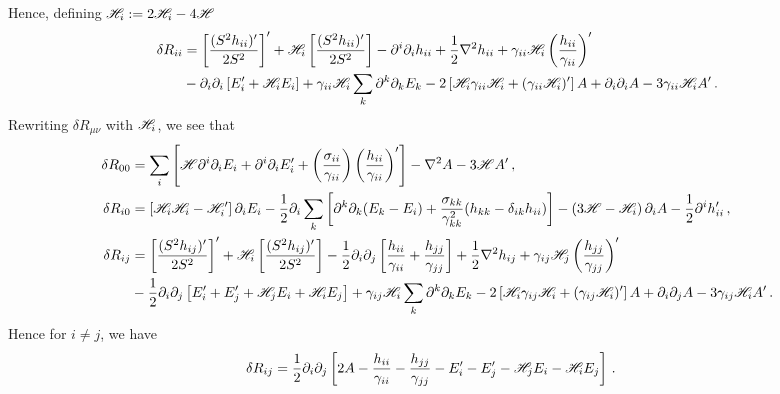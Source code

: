 \documentclass{article}
\newcommand*\scr[1]{\mathscr{#1}}
\newcommand*\p[1]{\left(#1\right)}
\newcommand*\ps[1]{\left[#1\right]}
\newcommand*\f[2]{\frac{#1}{#2}}
\begin{document}
Hence, defining ${\cal H}_i:=2\scr H_i-4\scr H$
\begin{align}
\delta R_{ii}&=\ps{\f{(S^2h_{ii})'}{2S^2}}'+{\cal H}_i\ps{\f{(S^2h_{ii})'}{2S^2}}-\partial^i\partial_ih_{ii}+\f12\nabla^2h_{ii}+\gamma_{ii}\scr H_i\p{\f{h_{ii}}{\gamma_{ii}}}'\\&-\partial_i\partial_i\ps{E_i'+{\cal H}_iE_i}+\gamma_{ii}\scr H_i\sum_k\partial^k\partial_kE_k-2\ps{{\cal H}_i\gamma_{ii}\scr H_i+(\gamma_{ii}\scr H_i)'}A+\partial_i\partial_i A-3\gamma_{ii}\scr H_i A'\,.
\end{align}
Rewriting $\delta R_{\mu\nu}$ with ${\cal H}_i$, we see that
\begin{align}
\delta R_{00}&=\sum_i\ps{\scr H\partial^i\partial_iE_i+\partial^i\partial_iE_i'+\p{\f{\sigma_{ii}}{\gamma_{ii}}}\p{\f{h_{ii}}{\gamma_{ii}}}'}-\nabla^2 A-3\scr H A'\,,\\
\notag\delta R_{i0}&=\ps{\scr H_i{\cal H}_i-\scr H_i'}\partial_i E_i-\f12\partial_i\sum_k\ps{\partial^k\partial_k(E_k-E_i)+\f{\sigma_{kk}}{\gamma_{kk}^2}(h_{kk}-\delta_{ik}h_{ii})}-\p{3\scr H-\scr H_i}\partial_i A-\f12\partial^ih_{ii}'\,,\\
\notag\delta R_{ij}&=\ps{\f{(S^2h_{ij})'}{2S^2}}'+{\cal H}_i\ps{\f{(S^2h_{ij})'}{2S^2}}-\f12\partial_i\partial_j\ps{\f{h_{ii}}{\gamma_{ii}}+\f{h_{jj}}{\gamma_{jj}}}+\f12\nabla^2h_{ij}+\gamma_{ij}\scr H_j\p{\f{h_{jj}}{\gamma_{jj}}}'\\&-\f12\partial_i\partial_j\ps{E_i'+E_j'+{\cal H}_jE_i+{\cal H}_iE_j}+\gamma_{ij}\scr H_i\sum_k\partial^k\partial_kE_k-2\ps{{\cal H}_i\gamma_{ij}\scr H_i+(\gamma_{ij}\scr H_i)'}A+\partial_i\partial_j A-3\gamma_{ij}\scr H_i A'\,.
\end{align}
Hence for $i\neq j$, we have
\begin{align}
\notag\delta R_{ij}&=\f12\partial_i\partial_j \ps{2A-\f{h_{ii}}{\gamma_{ii}}-\f{h_{jj}}{\gamma_{jj}}-E_i'-E_j'-{\cal H}_jE_i-{\cal H}_iE_j}\,.
\end{align}
\end{document}
